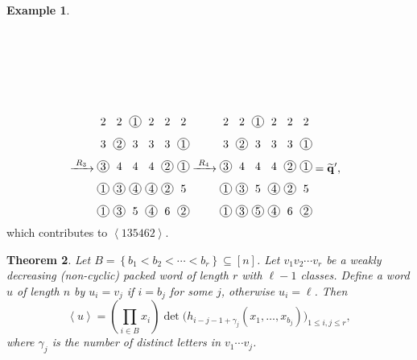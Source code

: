 \documentclass[reqno]{amsart}
\newcommand{\0}{\phantom{c}}
\newcommand{\swt}[1]{\left\langle #1 \right\rangle} %
\newcommand{\qq}{\mathbf{q}}
\let\prodnonlimits\prod
\renewcommand{\prod}{\prodnonlimits\limits}
\newcommand{\set}[1]{\left\{ #1 \right\}}
\newcommand{\ive}[1]{\left[ #1 \right]}
\theoremstyle{plain}
\newtheorem{thm}{Theorem}[section]
\theoremstyle{definition}
\newtheorem{example}[thm]{Example}
\numberwithin{equation}{section}
\begin{document}
\begin{example}
\begin{align*}
\begin{tikzpicture}[xscale=0.5,yscale=0.7,every node/.style={inner sep=0.8pt},baseline=55]
\end{tikzpicture}
\\[1.3em] &
\xrightarrow[\hspace{15pt}]{R_3}
\begin{tikzpicture}[xscale=0.5,yscale=0.7,every node/.style={inner sep=0.8pt},baseline=55]
\node at (0, 5){2};\node at (1, 5){2};\node[circle, draw=black] at (2, 5){1};\node at (3, 5){2};\node at (4, 5){2};\node at (5, 5){2};\node at (0, 4){3};\node[circle, draw=black] at (1, 4){2};\node at (2, 4){3};\node at (3, 4){3};\node at (4, 4){3};\node[circle, draw=black] at (5, 4){1};\node[circle, draw=black] at (0, 3){3};\node at (1, 3){4};\node at (2, 3){4};\node at (3, 3){4};\node[circle, draw=black] at (4, 3){2};\node[circle, draw=black] at (5, 3){1};\node[circle, draw=black] at (0, 2){1};\node[circle, draw=black] at (1, 2){3};\node[circle, draw=black] at (2, 2){4};\node[circle, draw=black] at (3, 2){4};\node[circle, draw=black] at (4, 2){2};\node at (5, 2){5};\node[circle, draw=black] at (0, 1){1};\node[circle, draw=black] at (1, 1){3};\node at (2, 1){5};\node[circle, draw=black] at (3, 1){4};\node at (4, 1){6};\node[circle, draw=black] at (5, 1){2};\end{tikzpicture}
\xrightarrow[\hspace{15pt}]{R_4}
\begin{tikzpicture}[xscale=0.5,yscale=0.7,every node/.style={inner sep=0.8pt},baseline=55]
\node at (0, 5){2};\node at (1, 5){2};\node[circle, draw=black] at (2, 5){1};\node at (3, 5){2};\node at (4, 5){2};\node at (5, 5){2};\node at (0, 4){3};\node[circle, draw=black] at (1, 4){2};\node at (2, 4){3};\node at (3, 4){3};\node at (4, 4){3};\node[circle, draw=black] at (5, 4){1};\node[circle, draw=black] at (0, 3){3};\node at (1, 3){4};\node at (2, 3){4};\node at (3, 3){4};\node[circle, draw=black] at (4, 3){2};\node[circle, draw=black] at (5, 3){1};\node[circle, draw=black] at (0, 2){1};\node[circle, draw=black] at (1, 2){3};\node at (2, 2){5};\node[circle, draw=black] at (3, 2){4};\node[circle, draw=black] at (4, 2){2};\node at (5, 2){5};\node[circle, draw=black] at (0, 1){1};\node[circle, draw=black] at (1, 1){3};\node[circle, draw=black] at (2, 1){5};\node[circle, draw=black] at (3, 1){4};\node at (4, 1){6};\node[circle, draw=black] at (5, 1){2};
\end{tikzpicture} = \widetilde{\qq}',
\end{align*}
which contributes to $\swt{135462}$.
\end{example}


\begin{thm}
\label{thm:determinant_form}
  Let $B = \set{b_1 < b_2 < \cdots < b_r} \subseteq \ive{n}$.
  Let $v_1v_2 \dotsm v_r$ be a weakly decreasing (non-cyclic) packed word of length $r$ with $\ell-1$ classes.
  Define a word $u$ of length $n$ by $u_i = v_j$ if $i = b_j$ for some $j$, otherwise $u_i = \ell$.
  Then
  \[
  \swt{u} = \left( \prod_{i\in B} x_i \right) \det\bigl( h_{i-j-1+\gamma_j}(x_1, \dotsc, x_{b_j}) \bigr)_{1\leq i,j\leq r},
  \]
  where $\gamma_j$ is the number of distinct letters in $v_1 \dotsm v_j$.
\end{thm}
\end{document}
